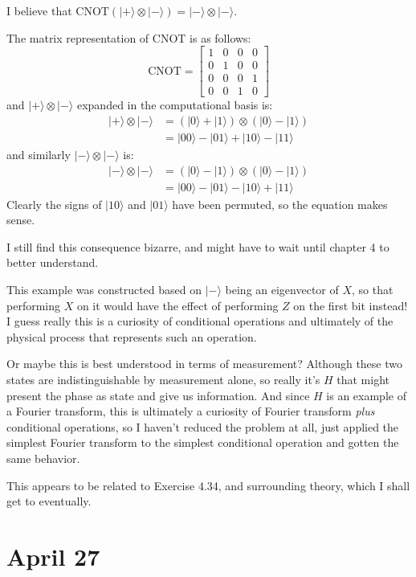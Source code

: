 \documentclass[]{article}
\newcommand{\ket}[1]{| #1 \rangle}
\newcommand{\CNOT}{\text{CNOT}}
\begin{document}
I believe that $\CNOT\left(\ket{+}\otimes\ket{-}\right) = \ket{-}\otimes\ket{-}$.

The matrix representation of CNOT is as follows:
\[
\CNOT = \left[\begin{matrix}
1&0&0&0\\
0&1&0&0\\
0&0&0&1\\
0&0&1&0
\end{matrix}\right]
\]
and $\ket{+}\otimes\ket{-}$ expanded in the computational basis is:
\begin{align*}
\ket{+}\otimes\ket{-}
&= \left(\ket{0}+\ket{1}\right) \otimes\left(\ket{0}-\ket{1}\right)
\\&= \ket{00}-\ket{01}+\ket{10}-\ket{11}
\end{align*}
and similarly $\ket{-}\otimes\ket{-}$ is:
\begin{align*}
\ket{-}\otimes\ket{-}
&= \left(\ket{0}-\ket{1}\right) \otimes\left(\ket{0}-\ket{1}\right)
\\&= \ket{00}-\ket{01}-\ket{10}+\ket{11}
\end{align*}
Clearly the signs of $\ket{10}$ and $\ket{01}$ have been permuted, so the equation makes sense.

I still find this consequence bizarre, and might have to wait until chapter 4 to better understand.

This example was constructed based on $\ket{-}$ being an eigenvector of $X$, so that performing $X$ on it would have the effect of performing $Z$ on the first bit instead! I guess really this is a curiosity of conditional operations and ultimately of the physical process that represents such an operation.

Or maybe this is best understood in terms of measurement? Although these two states are indistinguishable by measurement alone, so really it's $H$ that might present the phase as state and give us information. And since $H$ is an example of a Fourier transform, this is ultimately a curiosity of Fourier transform \textit{plus} conditional operations, so I haven't reduced the problem at all, just applied the simplest Fourier transform to the simplest conditional operation and gotten the same behavior.

This appears to be related to Exercise 4.34, and surrounding theory, which I shall get to eventually.

\section{April 27}
\end{document}
